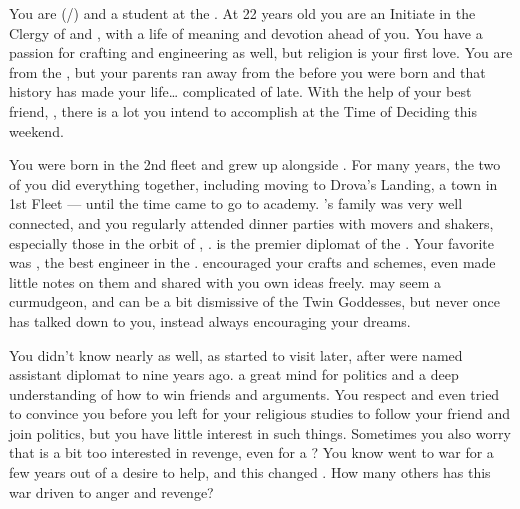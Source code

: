 \documentclass[char]{GL2020}
\begin{document}
\name{\cInitiate{}}

You are \cInitiate{\full} (\cInitiate{\they}/\cInitiate{\them}) and a student at the \pSchool{}. At 22 years old you are an Initiate in the Clergy of \cEbb{} and \cFlow{}, with a life of meaning and devotion ahead of you. You have a passion for crafting and engineering as well, but religion is your first love. You are from the \pShip{}, but your parents ran away from the \pFarm{} before you were born and that history has made your life\ldots{} complicated of late. With the help of your best friend, \cPresident{\full}, there is a lot you intend to accomplish at the Time of Deciding this weekend.

You were born in the 2nd fleet and grew up alongside \cPresident{}. For many years, the two of you did everything together, including moving to Drova's Landing, a town in 1st Fleet — until the time came to go to academy. \cPresident{}’s family was very well connected, and you regularly attended dinner parties with movers and shakers, especially those in the orbit of \cPresident{\their} \cPresident{\auncle}, \cHeadDiplomat{\full}. \cHeadDiplomat{} is the premier diplomat of the \pShip{}. Your favorite was \cBunker{\full}, the best engineer in the \pShip{}. \cBunker{\they} encouraged your crafts and schemes, even made little notes on them and shared with you \cBunker{\their} own ideas freely. \cBunker{\They} may seem a curmudgeon, and can be a bit dismissive of the Twin Goddesses, but never once has talked down to you, instead always encouraging your dreams.  

You didn’t know \cJuniorStatesman{\full} nearly as well, as \cJuniorStatesman{\they} started to visit later, after \cJuniorStatesman{\they} were named assistant diplomat to \cHeadDiplomat{} nine years ago. \cJuniorStatesman{\They} \cJuniorStatesman{\have} a great mind for politics and a deep understanding of how to win friends and arguments. You respect \cJuniorStatesman{} and \cJuniorStatesman{\they} even tried to convince you before you left for your religious studies to follow your friend and join politics, but you have little interest in such things. Sometimes you also worry that \cJuniorStatesman{} is a bit too interested in revenge, even for a \pShippie{}? You know \cJuniorStatesman{\they} went to war for a few years out of a desire to help, and this changed \cJuniorStatesman{\them}. How many others has this war driven to anger and revenge?
\end{document}
